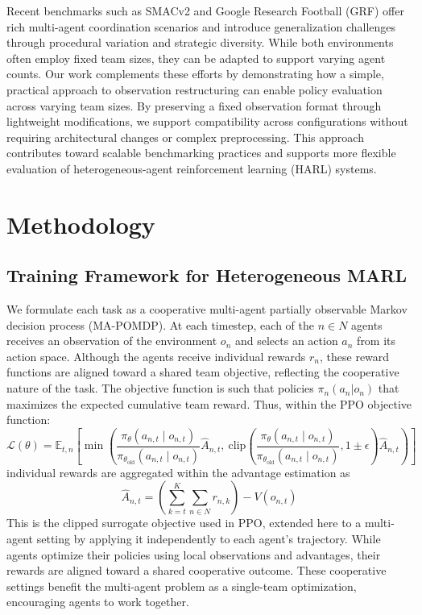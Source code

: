 \documentclass{article}
\begin{document}
Recent benchmarks such as SMACv2 \cite{ellis2023} and 
Google Research Football (GRF) \cite{kurach2020} offer rich multi-agent coordination scenarios 
and introduce generalization challenges through procedural variation and strategic diversity. 
While both environments often employ fixed team sizes, 
they can be adapted to support varying agent counts.
Our work complements these efforts by demonstrating how a simple, practical approach to observation 
restructuring can enable policy evaluation across varying team sizes. By preserving a fixed 
observation format through lightweight modifications, we support compatibility across configurations 
without requiring architectural changes or complex preprocessing.
This approach contributes toward scalable benchmarking practices and supports 
more flexible evaluation of heterogeneous-agent reinforcement learning (HARL) systems.




\section{Methodology}\label{sec:methodology}

\subsection{Training Framework for Heterogeneous MARL}
\label{subsec:training_framework}

We formulate each task as a cooperative multi-agent partially observable Markov 
decision process (MA-POMDP). At each timestep, each of the $n\in N$ agents receives 
an observation of the environment $o_n$ and selects an action $a_n$ from its action space. 
Although the agents receive individual rewards $r_n$, these reward functions are aligned 
toward a shared team objective, reflecting the cooperative nature of the task.
The objective function is such that policies \(\pi_n(a_n|o_n)\)
that maximizes the expected cumulative team reward. Thus, within the PPO objective function:
\[
    \mathcal{L}(\theta) = \mathbb{E}_{t,n} \left[ 
    \min \left( 
    \frac{\pi_\theta(a_{n,t} \mid o_{n,t})}{\pi_{\theta_{\text{old}}}(a_{n,t} \mid o_{n,t})} \hat{A}_{n,t},\ 
    \text{clip}\left( 
    \frac{\pi_\theta(a_{n,t} \mid o_{n,t})}{\pi_{\theta_{\text{old}}}(a_{n,t} \mid o_{n,t})}, 
    1 \pm \epsilon
    \right) \hat{A}_{n,t}
    \right) 
    \right]
\]
individual rewards are aggregated within the advantage estimation as
\[
    \hat{A}_{n,t} = \left( \sum_{k=t}^{K} \sum_{n\in N} r_{n,k} \right) - V(o_{n,t})
\]
This is the clipped surrogate objective used in PPO, extended here to a multi-agent setting by 
applying it independently to each agent's trajectory. While agents optimize their policies using
local observations and advantages, their rewards are aligned toward a shared cooperative outcome.
These cooperative settings benefit the multi-agent problem as a single-team optimization, 
encouraging agents to work together. 
\end{document}
